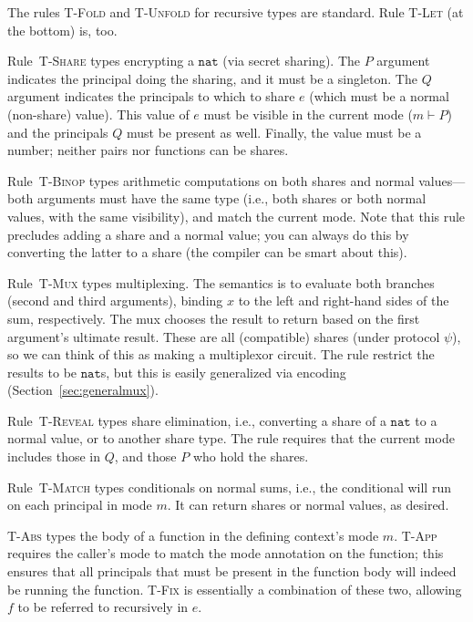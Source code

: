 \documentclass[10pt]{article}
\makeatletter
\newcommand{\rulelab}[1]{{\small \textsc{#1}}}
\newcommand{\kw}[1]{\ensuremath{\mathtt{#1}}}
\newcommand{\tnat}{\ensuremath{\mathtt{nat}}}
\newcommand{\vloc}[2]{\ensuremath{{#1}\kw{@}{#2}}}
\newcommand{\vcrash}{\ensuremath{\bullet}}
\makeatother
\begin{document}
The rules \rulelab{T-Fold} and \rulelab{T-Unfold} for recursive types
are standard. Rule \rulelab{T-Let} (at the bottom) is, too.

Rule~\rulelab{T-Share} types encrypting a $\tnat$ (via secret
sharing). The $P$ argument indicates the principal doing the sharing,
and it must be a singleton. The $Q$ argument indicates the principals
to which to share $e$ (which must be a normal (non-share) value). This
value of $e$ must be visible in the current mode ($m \vdash P$) and
the principals $Q$ must be present as well. Finally, the value must be
a number; neither pairs nor functions can be shares.

Rule~\rulelab{T-Binop} types arithmetic computations on both shares
and normal values---both arguments must have the same type (i.e., both
shares or both normal values, with the same visibility), and match the
current mode. Note that this rule precludes adding a 
share and a normal value; you can always do this by converting the
latter to a share (the compiler can be smart about this).

Rule~\rulelab{T-Mux} types multiplexing. The semantics is to evaluate
both branches (second and third arguments), binding $x$ to the left
and right-hand sides of the sum, respectively. The mux chooses
the result to return based on the first argument's ultimate
result. These are all (compatible) shares (under protocol $\psi$), so
we can think of this as making a multiplexor circuit. The rule
restrict the results to be $\tnat$s, but this is easily generalized
via encoding (Section~\ref{sec:generalmux}).

Rule~\rulelab{T-Reveal} types share elimination, i.e., converting a
share of a $\tnat$ to a normal value, or to another share type. The
rule requires that the current mode includes those in $Q$, and those
$P$ who hold the shares.

Rule~\rulelab{T-Match} types conditionals on normal sums, i.e., the
conditional will run on each principal in mode $m$. It can return
shares or normal values, as desired. 

\rulelab{T-Abs} types the body of a function in the defining context's
mode $m$. \rulelab{T-App} requires the caller's mode to match the mode
annotation on the function; this ensures that all principals that must
be present in the function body will indeed be running the
function. \rulelab{T-Fix} is essentially a combination of these two,
allowing $f$ to be referred to recursively in $e$.

\end{document}
